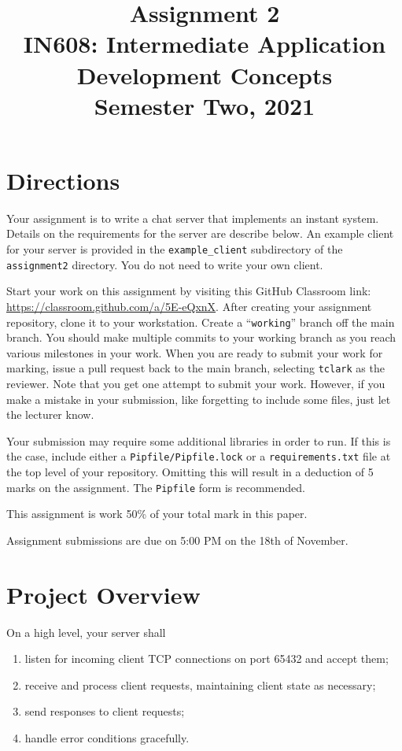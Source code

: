 \documentclass{article}
\begin{document}
\title{Assignment 2\\IN608: Intermediate Application Development Concepts \\Semester Two, 2021}
\date{}
\maketitle

\section*{Directions}
Your assignment is to write a chat server that implements an instant system. Details on the requirements for the server are describe below. An example
client for your server is provided in the \texttt{example\_client} subdirectory of the \texttt{assignment2} directory. You do not need to write your own client.

Start your work on this assignment by visiting this GitHub Classroom link: \url{https://classroom.github.com/a/5E-eQxnX}. After creating your assignment repository, clone it to your workstation.  Create a ``\texttt{working}'' branch off the main branch.  You should make multiple commits to your working branch as you reach various milestones in your work. When you are ready to submit your work for marking, issue a pull request back to the main branch, selecting \texttt{tclark} as the reviewer. Note that you get one attempt to submit your work. However, if you make a mistake in your submission, like forgetting to include some files, just let the lecturer know.


Your submission may require some additional libraries in order to run. If this is the case, include either a \texttt{Pipfile/Pipfile.lock} or a \texttt{requirements.txt} file at the top level of your repository. Omitting this will result in a deduction of 5 marks on the assignment. The \texttt{Pipfile} form is recommended.

This assignment is work 50\% of your total mark in this paper.


Assignment submissions are due on 5:00 PM on the 18th of November.

\section{Project Overview}

On a high level, your server shall
    \begin{enumerate}
      \item listen for incoming client TCP connections on port 65432 and accept them;
      \item receive and process client requests, maintaining client state as necessary;
      \item send responses to client requests;
      \item handle error conditions gracefully.
    \end{enumerate}   
    
\end{document}

